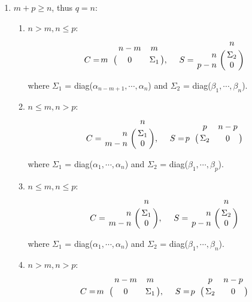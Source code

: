         \begin{enumerate}
            \item $m + p \geq n$, thus $q = n$:
                \begin{enumerate}
                    \item $n > m, n \leq p$:
                        \begin{displaymath}
                            C = \bordermatrix{ & n-m & m   \cr
                            \hfill m & 0 & \Sigma_1}, \  \ \ \
                            S = \bordermatrix{ & n  \cr
                            \hfill n & \Sigma_2 \cr
                            \hfill p-n & 0 }
                         \end{displaymath}
                         
                        where $\Sigma_1$ = diag($\alpha_{n-m+1}, \cdots, \alpha_{n}$) and $\Sigma_2$ = diag($\beta_1, \cdots, \beta_n$).
                    \item $n \leq m, n > p$:
                        \begin{displaymath}
                            C = \bordermatrix{ & n  \cr
                            \hfill n & \Sigma_1 \cr
                            \hfill m-n & 0 }, \ \ \ \
                            S = \bordermatrix{ & p & n-p   \cr
                            \hfill p & \Sigma_2 & 0}
                        \end{displaymath}
                        
                        where $\Sigma_1$ = diag($\alpha_1, \cdots, \alpha_{n}$) and $\Sigma_2$ = diag($\beta_1, \cdots, \beta_p$).
                    \item $n \leq m, n \leq p$:
                        \begin{displaymath}
                            C = \bordermatrix{ & n  \cr
                            \hfill n & \Sigma_1 \cr
                            \hfill m-n & 0 }, \ \ \ \
                            S = \bordermatrix{ & n  \cr
                            \hfill n & \Sigma_2 \cr
                            \hfill p-n & 0 }
                        \end{displaymath}
                        
                        where $\Sigma_1$ = diag($\alpha_1, \cdots, \alpha_{n}$) and $\Sigma_2$ = diag($\beta_1, \cdots, \beta_n$).
                    
                    \item $n > m, n > p$:
                        \begin{displaymath}
                            C = \bordermatrix{ & n-m & m   \cr
                            \hfill m & 0 & \Sigma_1}, \  \ \ \
                            S = \bordermatrix{ & p & n-p   \cr
                            \hfill p & \Sigma_2 & 0}
                        \end{displaymath}
                        

\end{enumerate}
\end{enumerate}
